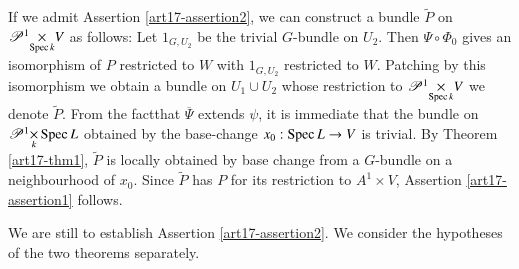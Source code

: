 If we admit Assertion \ref{art17-assertion2}, we can construct a bundle $\tilde{P}$ on $\fprod{\mathscr{P}^1}{V}{\Spec k}$ as follows: Let $1_{G,U_2}$ be the trivial $G$-bundle on $U_2$. Then $\Psi \circ \Phi_0$ gives an isomorphism of $P$ restricted to $W$ with $1_{G,U_2}$ restricted to $W$. Patching by this isomorphism we obtain a bundle on $U_1 \cup U_2$ whose restriction to $\fprod{\mathscr{P}^1}{V}{\Spec k} $ we denote $\tilde{P}$. From the fact\pageoriginale that $\overline{\Psi}$ extends $\psi$, it is immediate that the bundle on $\fprod{\mathscr{P}^1}{\Spec L}{k}$ obtained by the base-change $x_0: \operatorname{Spec} L \to V$ is trivial. By Theorem \ref{art17-thm1}, $\tilde{P}$ is locally obtained by base change from a $G$-bundle on a neighbourhood of $x_0$. Since $\tilde{P}$ has $P$ for its restriction to $A^1 \times V$, Assertion \ref{art17-assertion1} follows.

We are still to establish Assertion \ref{art17-assertion2}. We consider the hypotheses of the two theorems separately.

